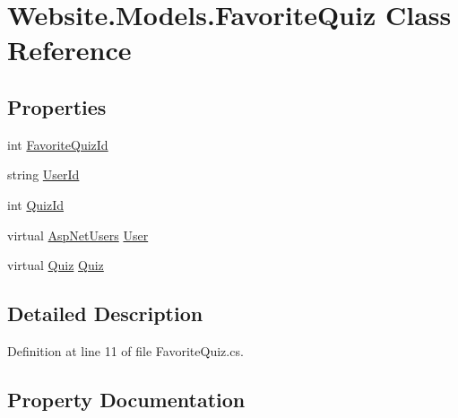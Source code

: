 \hypertarget{class_website_1_1_models_1_1_favorite_quiz}{}\section{Website.\+Models.\+Favorite\+Quiz Class Reference}
\label{class_website_1_1_models_1_1_favorite_quiz}
\subsection*{Properties}
\begin{DoxyCompactItemize}
\item 
int \hyperlink{class_website_1_1_models_1_1_favorite_quiz_a0dcb4d96d383cfb2f33492c4ee2564a0}{Favorite\+Quiz\+Id}
\item 
string \hyperlink{class_website_1_1_models_1_1_favorite_quiz_a0b356c76b9c880718760e02263587b8a}{User\+Id}
\item 
int \hyperlink{class_website_1_1_models_1_1_favorite_quiz_aa9bb9f6b3f135d2105efc657999cc7fa}{Quiz\+Id}
\item 
virtual \hyperlink{class_website_1_1_asp_net_users}{Asp\+Net\+Users} \hyperlink{class_website_1_1_models_1_1_favorite_quiz_a93771e9824a5520ff5e9d0c77c0a9058}{User}
\item 
virtual \hyperlink{class_website_1_1_models_1_1_quiz}{Quiz} \hyperlink{class_website_1_1_models_1_1_favorite_quiz_a760d134e23df9c7b1be5e520263e42b0}{Quiz}
\end{DoxyCompactItemize}


\subsection{Detailed Description}


Definition at line 11 of file Favorite\+Quiz.\+cs.



\subsection{Property Documentation}
\hypertarget{class_website_1_1_models_1_1_favorite_quiz_a0dcb4d96d383cfb2f33492c4ee2564a0}{}
